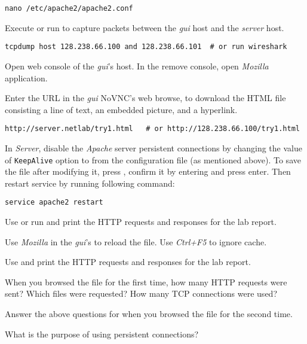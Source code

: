 \documentclass{../UTNetLab}
\begin{document}
\begin{lstlisting}
nano /etc/apache2/apache2.conf
\end{lstlisting}

Execute  or run  to capture packets between the \textit{gui} host and the \textit{server} host.

\begin{lstlisting}
tcpdump host 128.238.66.100 and 128.238.66.101  # or run wireshark
\end{lstlisting}

Open web console of the \textit{gui}'s host.
In the remove console, open \textit{Mozilla}  application.


Enter the URL in the \textit{gui} NoVNC's web browse, to download the HTML file consisting a line of text, an embedded picture, and a hyperlink.

\begin{lstlisting}
http://server.netlab/try1.html   # or http://128.238.66.100/try1.html
\end{lstlisting}

In \textit{Server}, disable the \textit{Apache} server persistent connections by changing the value of \texttt{KeepAlive} option to  from the configuration file (as mentioned above). To save the file after modifying it, press , confirm it by entering  and press enter. Then restart  service by running following command:

\begin{lstlisting}
service apache2 restart
\end{lstlisting}

Use  or run  and print the HTTP requests and responses for the lab report.

Use \textit{Mozilla} in the \textit{gui}'s to reload the  file.
Use \textit{Ctrl+F5} to ignore cache.

Use  and print the HTTP requests and responses for the lab report.

\begin{report}
    \item When you browsed the  file for the first time, how many HTTP requests were sent?
    Which files were requested?
    How many TCP connections were used?

    \item Answer the above questions for when you browsed the  file for the second time.

    \item What is the purpose of using persistent connections?
\end{report}
\end{document}
